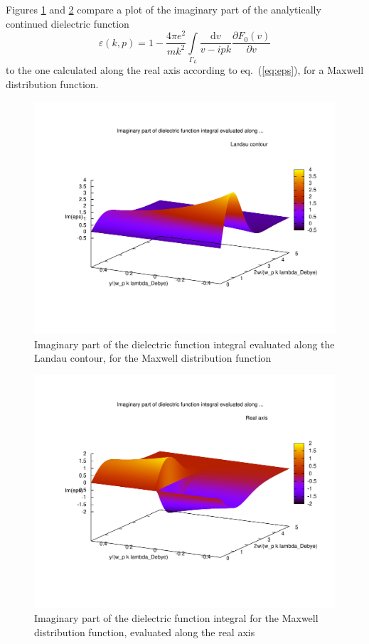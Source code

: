 \documentclass[physics,phd,nolot,nolof]{uccthesis}%
\begin{document}
Figures \ref{fig:landaucontourimeps} and \ref{fig:realcontourimeps}
compare a plot of the imaginary part of the analytically continued dielectric function
\begin{equation}
\varepsilon(k,p)=1-\frac{4\pi e^2}{m k^2}
\int\limits_{\Gamma_L}\frac{\mathrm{d} v}{v-ipk}\frac{\partial F_0(v)}{\partial v}
	\label{eq:eps-Landau}
\end{equation}
to the one calculated along the real axis according to eq.~(\ref{eq:eps}), for a Maxwell distribution function.
\begin{figure}[h]
	\begin{center}
	\includegraphics[width=\textwidth]{landau.pdf}
	\end{center}
	\caption{Imaginary part of the dielectric function integral evaluated along the Landau contour, for the Maxwell distribution function}
	\label{fig:landaucontourimeps}
\end{figure}
\begin{figure}[h]
	\begin{center}
	\includegraphics[width=\textwidth]{real.pdf}
	\end{center}
	\caption{Imaginary part of the dielectric function integral for the Maxwell distribution function, evaluated along the real axis}
	\label{fig:realcontourimeps}
\end{figure}
\end{document}
